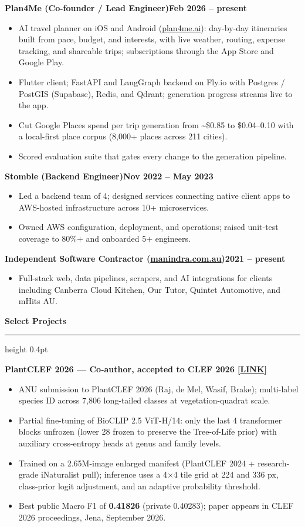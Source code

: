 \documentclass[11pt,a4paper]{article}
\newcommand{\edsection}[1]{%
  \par\vspace{6pt}%
  \textbf{#1}\par
  \vspace{0pt}\hrule height 0.4pt\vspace{2pt}%
}
\newcommand{\entry}[2]{\textbf{#1}\hfill\textbf{#2}\par}
\begin{document}
\entry{Plan4Me (Co-founder / Lead Engineer)}{Feb 2026 -- present}
\begin{itemize}
\item AI travel planner on iOS and Android (\href{https://plan4me.ai}{plan4me.ai}): day-by-day itineraries built from pace, budget, and interests, with live weather, routing, expense tracking, and shareable trips; subscriptions through the App Store and Google Play.
\item Flutter client; FastAPI and LangGraph backend on Fly.io with Postgres / PostGIS (Supabase), Redis, and Qdrant; generation progress streams live to the app.
\item Cut Google Places spend per trip generation from \textasciitilde\$0.85 to \$0.04--0.10 with a local-first place corpus (8,000+ places across 211 cities).
\item Scored evaluation suite that gates every change to the generation pipeline.
\end{itemize}

\entry{Stomble (Backend Engineer)}{Nov 2022 -- May 2023}
\begin{itemize}
\item Led a backend team of 4; designed services connecting native client apps to AWS-hosted infrastructure across 10+ microservices.
\item Owned AWS configuration, deployment, and operations; raised unit-test coverage to 80\%+ and onboarded 5+ engineers.
\end{itemize}

\entry{Independent Software Contractor (\href{https://manindra.com.au}{manindra.com.au})}{2021 -- present}
\begin{itemize}
\item Full-stack web, data pipelines, scrapers, and AI integrations for clients including Canberra Cloud Kitchen, Our Tutor, Quintet Automotive, and mHits AU.
\end{itemize}

\edsection{Select Projects}

\textbf{PlantCLEF 2026 --- Co-author, accepted to CLEF 2026 [\href{https://arm-wision.github.io/}{LINK}]}
\begin{itemize}
\item ANU submission to PlantCLEF 2026 (Raj, de Mel, Wasif, Brake); multi-label species ID across 7,806 long-tailed classes at vegetation-quadrat scale.
\item Partial fine-tuning of BioCLIP 2.5 ViT-H/14: only the last 4 transformer blocks unfrozen (lower 28 frozen to preserve the Tree-of-Life prior) with auxiliary cross-entropy heads at genus and family levels.
\item Trained on a 2.65M-image enlarged manifest (PlantCLEF 2024 + research-grade iNaturalist pull); inference uses a 4$\times$4 tile grid at 224 and 336 px, class-prior logit adjustment, and an adaptive probability threshold.
\item Best public Macro F1 of \textbf{0.41826} (private 0.40283); paper appears in CLEF 2026 proceedings, Jena, September 2026.
\end{itemize}
\end{document}
